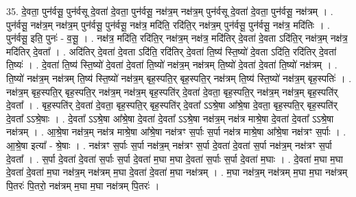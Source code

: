 \documentclass[17pt]{extarticle}
\begin{document}
35. दे॒वता॒ पुन॑र्वसू॒ पुन॑र्वसू दे॒वता॑ दे॒वता॒ पुन॑र्वसू॒ नक्ष॑त्र॒म् नक्ष॑त्र॒म् पुन॑र्वसू दे॒वता॑ दे॒वता॒ पुन॑र्वसू॒ नक्ष॑त्रम् । . पुन॑र्वसू॒ नक्ष॑त्र॒म् नक्ष॑त्र॒म् पुन॑र्वसू॒ पुन॑र्वसू॒ नक्ष॑त्र॒ मदि॑ति॒ रदि॑ति॒र् नक्ष॑त्र॒म् पुन॑र्वसू॒ पुन॑र्वसू॒ नक्ष॑त्र॒ मदि॑तिः । . पुन॑र्वसू॒ इति॒ पुनः॑ - व॒सू॒ । . नक्ष॑त्र॒ मदि॑ति॒ रदि॑ति॒र् नक्ष॑त्र॒म् नक्ष॑त्र॒ मदि॑तिर् दे॒वता॑ दे॒वता ऽदि॑ति॒र् नक्ष॑त्र॒म् नक्ष॑त्र॒ मदि॑तिर् दे॒वता᳚ । . अदि॑तिर् दे॒वता॑ दे॒वता ऽदि॑ति॒ रदि॑तिर् दे॒वता॑ ति॒ष्य॑ स्ति॒ष्यो॑ दे॒वता ऽदि॑ति॒ रदि॑तिर् दे॒वता॑ ति॒ष्यः॑ । . दे॒वता॑ ति॒ष्य॑ स्ति॒ष्यो॑ दे॒वता॑ दे॒वता॑ ति॒ष्यो॑ नक्ष॑त्र॒म् नक्ष॑त्रम् ति॒ष्यो॑ दे॒वता॑ दे॒वता॑ ति॒ष्यो॑ नक्ष॑त्रम् । . ति॒ष्यो॑ नक्ष॑त्र॒म् नक्ष॑त्रम् ति॒ष्य॑ स्ति॒ष्यो॑ नक्ष॑त्र॒म् बृह॒स्पति॒र् बृह॒स्पति॒र् नक्ष॑त्रम् ति॒ष्य॑ स्ति॒ष्यो॑ नक्ष॑त्र॒म् बृह॒स्पतिः॑ । . नक्ष॑त्र॒म् बृह॒स्पति॒र् बृह॒स्पति॒र् नक्ष॑त्र॒म् नक्ष॑त्र॒म् बृह॒स्पति॑र् दे॒वता॑ दे॒वता॒ बृह॒स्पति॒र् नक्ष॑त्र॒म् नक्ष॑त्र॒म् बृह॒स्पति॑र् दे॒वता᳚ । . बृह॒स्पति॑र् दे॒वता॑ दे॒वता॒ बृह॒स्पति॒र् बृह॒स्पति॑र् दे॒वता᳚ ऽऽश्रे॒षा आ᳚श्रे॒षा दे॒वता॒ बृह॒स्पति॒र् बृह॒स्पति॑र् दे॒वता᳚ ऽऽश्रे॒षाः । . दे॒वता᳚ ऽऽश्रे॒षा आ᳚श्रे॒षा दे॒वता॑ दे॒वता᳚ ऽऽश्रे॒षा नक्ष॑त्र॒म् नक्ष॑त्र माश्रे॒षा दे॒वता॑ दे॒वता᳚ ऽऽश्रे॒षा नक्ष॑त्रम् । . आ॒श्रे॒षा नक्ष॑त्र॒म् नक्ष॑त्र माश्रे॒षा आ᳚श्रे॒षा नक्ष॑त्रꣳ स॒र्पाः स॒र्पा नक्ष॑त्र माश्रे॒षा आ᳚श्रे॒षा नक्ष॑त्रꣳ स॒र्पाः । . आ॒श्रे॒षा इत्या᳚ - श्रे॒षाः । . नक्ष॑त्रꣳ स॒र्पाः स॒र्पा नक्ष॑त्र॒म् नक्ष॑त्रꣳ स॒र्पा दे॒वता॑ दे॒वता॑ स॒र्पा नक्ष॑त्र॒म् नक्ष॑त्रꣳ स॒र्पा दे॒वता᳚ । . स॒र्पा दे॒वता॑ दे॒वता॑ स॒र्पाः स॒र्पा दे॒वता॑ म॒घा म॒घा दे॒वता॑ स॒र्पाः स॒र्पा दे॒वता॑ म॒घाः । . दे॒वता॑ म॒घा म॒घा दे॒वता॑ दे॒वता॑ म॒घा नक्ष॑त्र॒म् नक्ष॑त्रम् म॒घा दे॒वता॑ दे॒वता॑ म॒घा नक्ष॑त्रम् । . म॒घा नक्ष॑त्र॒म् नक्ष॑त्रम् म॒घा म॒घा नक्ष॑त्रम् पि॒तरः॑ पि॒तरो॒ नक्ष॑त्रम् म॒घा म॒घा नक्ष॑त्रम् पि॒तरः॑ । \newline
\end{document}
